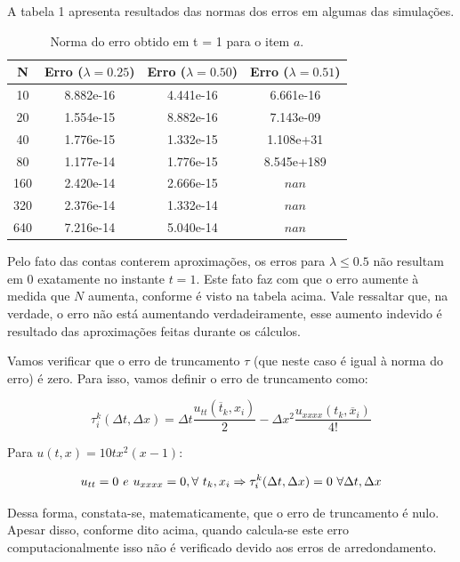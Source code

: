\documentclass[a4paper, 12pt]{article}
\begin{document}
A tabela 1 apresenta resultados das normas dos erros em algumas das simulações.

\begin{table}[!h]
    \centering
    \begin{tabular}{|c|c|c|c|}
    \hline                               %
    N & Erro ($\lambda = 0.25$) & Erro ($\lambda = 0.50$) & Erro ($\lambda = 0.51$) \\
    \hline
    10  &  8.882e-16 & 4.441e-16 & 6.661e-16 \\
    20  &  1.554e-15 & 8.882e-16 & 7.143e-09 \\
    40  &  1.776e-15 & 1.332e-15 & 1.108e+31 \\
    80  &  1.177e-14 & 1.776e-15 & 8.545e+189 \\
    160 &  2.420e-14 & 2.666e-15 & $nan$ \\
    320 &  2.376e-14 & 1.332e-14 & $nan$ \\
    640 &  7.216e-14 & 5.040e-14 & $nan$ \\
    \hline
    \end{tabular}
    \caption{Norma do erro obtido em t = 1 para o item $a$.}
\end{table}

Pelo fato das contas conterem aproximações, os erros para $\lambda \leq 0.5$ não resultam em 0 exatamente no instante $t=1$. Este fato faz com que o erro aumente à medida que $N$ aumenta, conforme é visto na tabela acima. Vale ressaltar que, na verdade, o erro não está aumentando verdadeiramente, esse aumento indevido é resultado das aproximações feitas durante os cálculos.

Vamos verificar que o erro de truncamento $\tau$ (que neste caso é igual à norma do erro) é zero. Para isso, vamos definir o erro de truncamento como:

$$
\tau^k_i(\Delta t, \Delta x) = \Delta t \frac{u_{tt}(\overline{t}_k,x_i)}{2} - \Delta x^2 \frac{u_{xxxx}(t_k, \overline{x}_i)}{4!}
$$

Para $u(t,x)=10tx^2(x-1):$

$$
u_{tt}=0 \hspace{3.5pt} e \hspace{3.5pt} u_{xxxx}=0, \forall \ t_k, x_i \Rightarrow \tau^k_i(\Delta t, \Delta x)=0 \ \forall \Delta t, \Delta x 
$$

Dessa forma, constata-se, matematicamente, que o erro de truncamento é nulo. Apesar disso, conforme dito acima, quando calcula-se este erro computacionalmente isso não é verificado devido aos erros de arredondamento.
\end{document}
